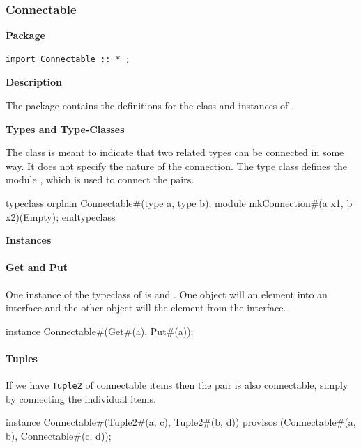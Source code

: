 \subsubsection{Connectable}
\label{lib-connectable}

{\bf Package }


\begin{verbatim}
import Connectable :: * ;
\end{verbatim}

{\bf Description}

The  package contains the definitions for the class
 and  instances of . 


{\bf Types and Type-Classes}

The class  is meant to indicate that
two related types can be connected in some way.  It does not specify the nature
of the connection.  The  type class defines the module
, which is used to connect the pairs.

\begin{libverbatim}
typeclass orphan Connectable#(type a, type b);
    module mkConnection#(a x1, b x2)(Empty);
endtypeclass
\end{libverbatim}

{\bf Instances}
\paragraph {Get and Put} One instance of the typeclass of
  is  and .  One
object will 
an element into an interface and the other object will  the
element from the interface.

\begin{libverbatim}
instance Connectable#(Get#(a), Put#(a));
\end{libverbatim}

\paragraph{Tuples} If we have {\tt Tuple2} of connectable items
then the  pair is also
connectable, simply by connecting the individual items.
\begin{libverbatim}
instance Connectable#(Tuple2#(a, c), Tuple2#(b, d))
  provisos (Connectable#(a, b), Connectable#(c, d));
\end{libverbatim}

